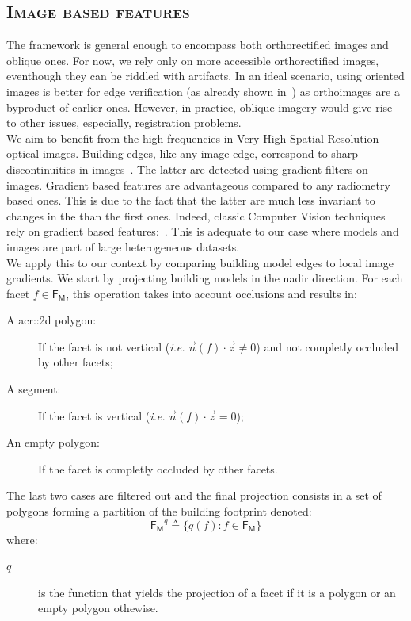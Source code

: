     \subsection{\textsc{Image based features}}
        \label{subsec::learned_evaluation::baseline::image}
        The framework is general enough to encompass both orthorectified images and oblique ones.
        For now, we rely only on more accessible orthorectified images, eventhough they can be riddled with artifacts.
        In an ideal scenario, using oriented images is better for edge verification (as already shown in~\parencite{michelin2013quality}) as orthoimages are a byproduct of earlier ones.
        However, in practice, oblique imagery would give rise to other issues, especially, registration problems.\\

        We aim to benefit from the high frequencies in Very High Spatial Resolution optical images.
        Building edges, like any image edge, correspond to sharp discontinuities in images~\parencite{ortner2007building}.
        The latter are detected using gradient filters on images.
        Gradient based features are advantageous compared to any radiometry based ones.
        This is due to the fact that the latter are much less invariant to changes in the than the first ones.
        Indeed, classic Computer Vision techniques rely on gradient based features:~\textcite{lowe2004distinctive,dalal2005histograms}.
        This is adequate to our case where models and images are part of large heterogeneous datasets.\\
        
        We apply this to our context by comparing building model edges to local image gradients.
        We start by projecting building models in the nadir direction.
        For each facet \(f \in \mathsf{F_M}\), this operation takes into account occlusions and results in:
        \begin{description}
            \item[A \gls{acr::2d} polygon:] If the facet is not vertical (\textit{i.e.} \(\vec{n}(f) \cdot \vec{z} \neq 0\)) and not completly occluded by other facets;
            \item[A segment:] If the facet is vertical (\textit{i.e.} \(\vec{n}(f) \cdot \vec{z} = 0\));
            \item[An empty polygon:] If the facet is completly occluded by other facets.
        \end{description}
        The last two cases are filtered out and the final projection consists in a set of polygons forming a partition of the building footprint denoted:
        \begin{equation}
            \label{eq::facet_projections}
            \mathsf{F_M}^q \triangleq \{q(f): f \in \mathsf{F_M}\}
        \end{equation}
        where:
        \begin{description}
            \item[\(q\)] is the function that yields the projection of a facet if it is a polygon or an empty polygon othewise.
        \end{description}

